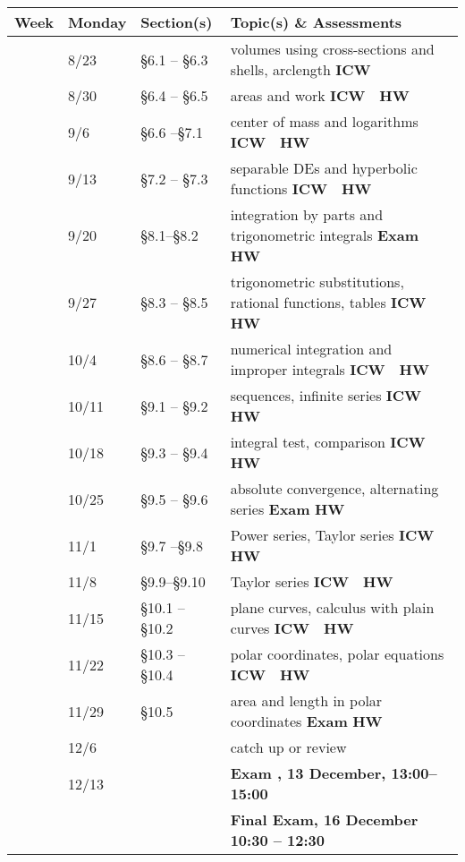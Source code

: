 \documentclass[12pt]{article}
\newcounter{qz}\setcounter{qz}{0}
\newcommand{\qz}{%
\setcounter{qz}{\value{qz}+1}
\textbf{ICW  \theqz} \,\,}
\newcounter{hw}\setcounter{hw}{0}
\newcommand{\hw}{%
\setcounter{hw}{\value{hw}+1}
\textbf{HW \thehw} \,\,}
\newcounter{ex}\setcounter{ex}{0}
\newcommand{\ex}{%
\setcounter{ex}{\value{ex}+1}
Exam \theex}
\newcounter{wk}\setcounter{wk}{0}
\newcommand{\wk}{%
\setcounter{wk}{\value{wk}+1}
\thewk \,\,}
\begin{document}
\begin{center}
    \small
\begin{tabular}  {|l|l|l|l|}
\hline
{\bf Week}  & \textbf{Monday} &  {\bf Section(s)} & {\bf Topic(s) \& Assessments} \\
\hline \hline 
\wk    & 8/23 &    \S6.1 -- \S6.3   & volumes using cross-sections and shells, arclength \hfill \qz  \\
\wk    & 8/30  &  \S6.4 -- \S6.5   &  areas and work  \hfill \qz \hw  \\
\wk    & 9/6 &     \S6.6 --\S7.1  &  center of mass and logarithms \hfill \qz \hw \\
\wk    & 9/13  &     \S7.2 -- \S7.3  & separable DEs   and hyperbolic functions  \hfill \qz \hw            \\
\wk    & 9/20 &  \S8.1--\S8.2    &  integration by parts and trigonometric integrals    \hfill \textbf{\ex} \hw \\ \hline
\wk    & 9/27   & \S8.3 -- \S8.5   & trigonometric substitutions, rational functions, tables  \hfill \qz \hw  \\
\wk    & 10/4     & \S8.6 -- \S8.7  & numerical integration and improper integrals  \hfill \qz \hw  \\
\wk   & 10/11   & \S9.1 -- \S9.2  &   sequences, infinite series  \hfill \qz \hw  \\
\wk  &  10/18   & \S9.3 -- \S9.4 &  integral test, comparison   \hfill \qz  \hw \\ 
\wk &  10/25     &   \S9.5 -- \S9.6 &  absolute convergence, alternating series \hfill  \textbf{ \ex}  \hw \\ \hline
\wk  & 11/1  &   \S9.7 --\S9.8 & Power series, Taylor series \hfill \qz  \hw  \\
\wk   & 11/8  & \S9.9--\S9.10  &  Taylor series \hfill \qz \hw \\
\wk   & 11/15& \S10.1  -- \S10.2   & plane curves, calculus with plain curves   \hfill \qz \hw  \\
\wk   & 11/22   &  \S10.3 -- \S10.4   & polar coordinates, polar equations  \hfill \qz \hw  \\
\wk   & 11/29    &  \S10.5     &  area and length in polar coordinates  \hfill \textbf{ \ex}  \hw \\ \hline
\wk   & 12/6      &         &  catch up or review  \\  
\wk   & 12/13      &  &     \hfill \textbf{\ex,  13 December, 13:00--15:00} \\ 
         &               & &   \hfill  \textbf{ Final Exam, 16 December  10:30 -- 12:30} \\ \hline
\end{tabular}
\end{center}
\end{document}
